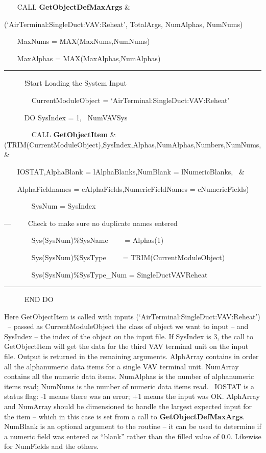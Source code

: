 ~~~ CALL \textbf{GetObjectDefMaxArgs} \&

(`AirTerminal:SingleDuct:VAV:Reheat', TotalArgs, NumAlphas, NumNums)

~~~ MaxNums = MAX(MaxNums,NumNums)

~~~ MaxAlphas = MAX(MaxAlphas,NumAlphas)

\begin{center}\rule{0.5\linewidth}{0.4pt}\end{center}

~~~~~ !Start Loading the System Input

~~~~~~~ CurrentModuleObject = `AirTerminal:SingleDuct:VAV:Reheat'

~~~~~ DO SysIndex = 1,~ NumVAVSys

~~~~~~~ CALL \textbf{GetObjectItem} \& (TRIM(CurrentModuleObject),SysIndex,Alphas,NumAlphas,Numbers,NumNums, \&

~~~ IOSTAT,AlphaBlank = lAlphaBlanks,NumBlank = lNumericBlanks,~ \&

~~~ AlphaFieldnames = cAlphaFields,NumericFieldNames = cNumericFields)

~~~~~~~ SysNum = SysIndex

---~~~~ Check to make sure no duplicate names entered

~~~~~~~ Sys(SysNum)\%SysName~~~~ = Alphas(1)

~~~~~~~ Sys(SysNum)\%SysType~~~~ = TRIM(CurrentModuleObject)

~~~ ~~~~Sys(SysNum)\%SysType\_Num = SingleDuctVAVReheat

\begin{center}\rule{0.5\linewidth}{0.4pt}\end{center}

~~~~~ END DO

Here GetObjectItem is called with inputs (`AirTerminal:SingleDuct:VAV:Reheat') ~-- passed as CurrentModuleObject the class of object we want to input -- and SysIndex -- the index of the object on the input file. If SysIndex is 3, the call to GetObjectItem will get the data for the third VAV terminal unit on the input file. Output is returned in the remaining arguments. AlphArray contains in order all the alphanumeric data items for a single VAV terminal unit. NumArray contains all the numeric data items. NumAlphas is the number of alphanumeric items read; NumNums is the number of numeric data items read.~ IOSTAT is a status flag: -1 means there was an error; +1 means the input was OK. AlphArray and NumArray should be dimensioned to handle the largest expected input for the item -- which in this case is set from a call to \textbf{GetObjectDefMaxArgs}. NumBlank is an optional argument to the routine -- it can be used to determine if a numeric field was entered as ``blank'' rather than the filled value of 0.0. Likewise for NumFields and the others.

